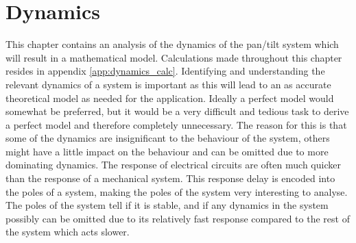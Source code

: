 \chapter{Dynamics}\label{chap:dynamics}
This chapter contains an analysis of the dynamics of the pan/tilt system which will result in a mathematical model. Calculations made throughout this chapter resides in appendix \ref{app:dynamics_calc}. Identifying and understanding the relevant dynamics of a system is important as this will lead to an as accurate theoretical model as needed for the application. Ideally a perfect model would somewhat be preferred, but it would be a very difficult and tedious task to derive a perfect model and therefore completely unnecessary. The reason for this is that some of the dynamics are insignificant to the behaviour of the system, others might have a little impact on the behaviour and can be omitted due to more dominating dynamics. The response of electrical circuits are often much quicker than the response of a mechanical system. This response delay is encoded into the poles of a system, making the poles of the system very interesting to analyse. The poles of the system tell if it is stable, and if any dynamics in the system possibly can be omitted due to its relatively fast response compared to the rest of the system which acts slower.

